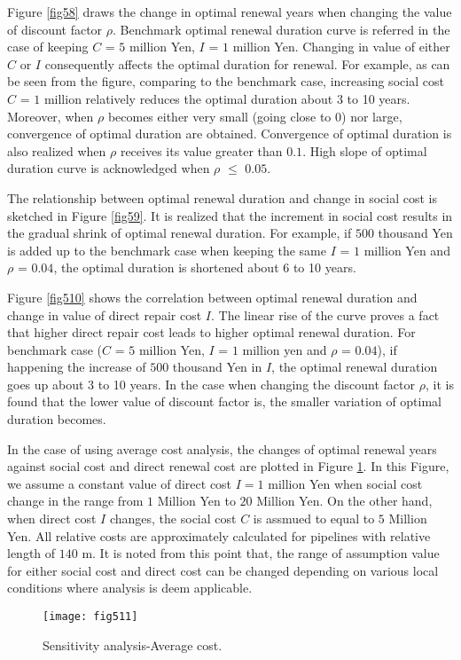 \documentclass[a4paper,oneside,onecolumn,preprint,10pt,authoryear]{elsarticle}
\begin{document}
Figure \ref{fig58} draws the change in optimal renewal years when changing the value of discount factor $\rho$. Benchmark optimal renewal duration curve is referred in the case of keeping $C$ = $5$ million Yen, $I$ = $1$ million Yen. Changing in value of either $C$ or $I$ consequently affects the optimal duration for renewal. For example, as can be seen from the figure, comparing to the benchmark case, increasing social cost $C$ = $1$ million relatively reduces the optimal duration about 3 to 10 years. Moreover, when $\rho$ becomes either very small (going close to $0$) nor large, convergence of optimal duration are obtained. Convergence of optimal duration is also realized when $\rho$ receives its value greater than $0.1$. High slope of optimal duration curve is acknowledged when $\rho$ $\le$ $0.05$.

The relationship between optimal renewal duration and change in social cost is sketched in Figure \ref{fig59}. It is realized that the increment in social cost results in the gradual shrink of optimal renewal duration. For example, if $500$ thousand Yen is added up to the benchmark case when keeping the same $I$ = $1$ million Yen and $\rho$ = $0.04$, the optimal duration is shortened about 6 to 10 years. %

Figure \ref{fig510} shows the correlation between optimal renewal duration and change in value of direct repair cost $I$. The linear rise of the curve proves a fact that higher direct repair cost leads to higher optimal renewal duration. For benchmark case ($C$ = $5$ million Yen, $I$ = $1$ million yen and $\rho$ = $0.04$), if happening the increase of $500$ thousand Yen in $I$, the optimal renewal duration goes up about 3 to 10 years. In the case when changing the discount factor $\rho$, it is found that the lower value of discount factor is, the smaller variation of optimal duration becomes.

In the case of using average cost analysis, the changes of optimal renewal years against social cost and direct renewal cost are plotted in Figure \ref{fig511}. In this Figure, we assume a constant value of direct cost $I=1$ million Yen when social cost change in the range from $1$ Million Yen to $20$ Million Yen. On the other hand, when direct cost $I$ changes, the social cost $C$ is assmued to equal to $5$ Million Yen. All relative costs are approximately calculated for pipelines with relative length of $140$ m. It is noted from this point that, the range of assumption value for either social cost and direct cost can be changed depending on various local conditions where analysis is deem applicable.
\begin{figure}
\begin{center}
\texttt{[image: fig511]} 
\end{center}
\caption{Sensitivity analysis-Average cost.}
\label{fig511} 
\end{figure}
\end{document}
